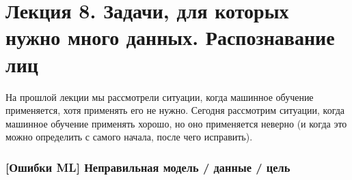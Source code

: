 \documentclass[main.tex]{subfiles}
\begin{document}
	
\section{Лекция 8. Задачи, для которых нужно много данных. Распознавание лиц }

На прошлой лекции мы рассмотрели ситуации, когда машинное обучение применяется, хотя применять его не нужно.
Сегодня рассмотрим ситуации, когда машинное обучение применять хорошо, но оно применяется неверно (и когда это можно определить с самого начала, после чего исправить).

\subsubsection{[Ошибки ML] Неправильная модель / данные / цель }
\end{document}
